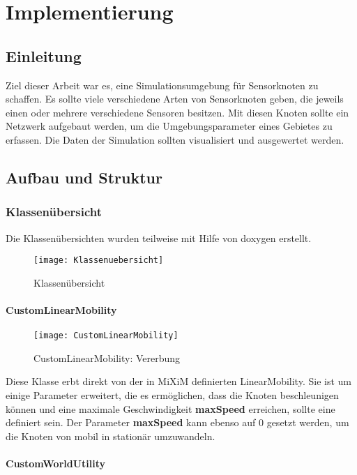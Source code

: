 \chapter{Implementierung}

\section{Einleitung}

Ziel dieser Arbeit war es, eine Simulationsumgebung für Sensorknoten zu schaffen. Es sollte viele verschiedene Arten von Sensorknoten geben, die jeweils einen oder mehrere verschiedene Sensoren besitzen. Mit diesen Knoten sollte ein Netzwerk aufgebaut werden, um die Umgebungsparameter eines Gebietes zu erfassen.
Die Daten der Simulation sollten visualisiert und ausgewertet werden.

\section{Aufbau und Struktur}

\subsection{Klassenübersicht}

Die Klassenübersichten wurden teilweise mit Hilfe von doxygen\cite{doxygen} erstellt. 

\begin{figure}[htbp]
\centering
\caption{Klassenübersicht}
\texttt{[image: Klassenuebersicht]}
\end{figure}

\subsubsection{CustomLinearMobility}

\begin{figure}[htbp]
\centering
\caption{CustomLinearMobility: Vererbung}
\texttt{[image: CustomLinearMobility]}
\end{figure}

Diese Klasse erbt direkt von der in MiXiM definierten LinearMobility. Sie ist um einige Parameter erweitert, die es ermöglichen, dass die Knoten beschleunigen können und eine maximale Geschwindigkeit \textbf{maxSpeed} erreichen, sollte eine definiert sein.
Der Parameter \textbf{maxSpeed} kann ebenso auf 0 gesetzt werden, um die Knoten von mobil in stationär umzuwandeln.

\subsubsection{CustomWorldUtility}

